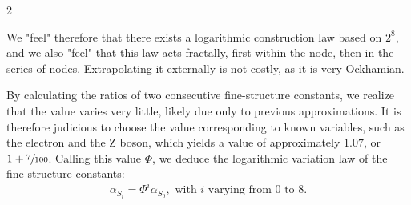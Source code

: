 \begin{multicols}{2}
	\begin{center}
	\end{center}
	
	We "feel" therefore that there exists a logarithmic construction law based on $2^8$, and we also "feel" that this law acts fractally, first within the node, then in the series of nodes. Extrapolating it externally is not costly, as it is very Ockhamian.
	
	By calculating the ratios of two consecutive fine-structure constants, we realize that the value varies very little, likely due only to previous approximations. It is therefore judicious to choose the value corresponding to known variables, such as the electron and the Z boson, which yields a value of approximately $1.07$, or $1 + \sfrac{7}{100}$. Calling this value $\Phi$, we deduce the logarithmic variation law of the fine-structure constants:
	\begin{equation}
		\label{eq:structure-fine}
		\alpha_{S_i} = \Phi^i \alpha_{S_0}, \text{ with } i \text{ varying from 0 to 8.} 
	\end{equation}
	

\end{multicols}
